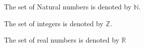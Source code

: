 \documentclass[11pt]{article}
\begin{document}
The set of Natural numbers is denoted by $\mathbb{N}$.

The set of integers is denoted by $\mathbb{Z}$.

The set of real numbers is denoted by $\mathbb{R}$
\end{document}
